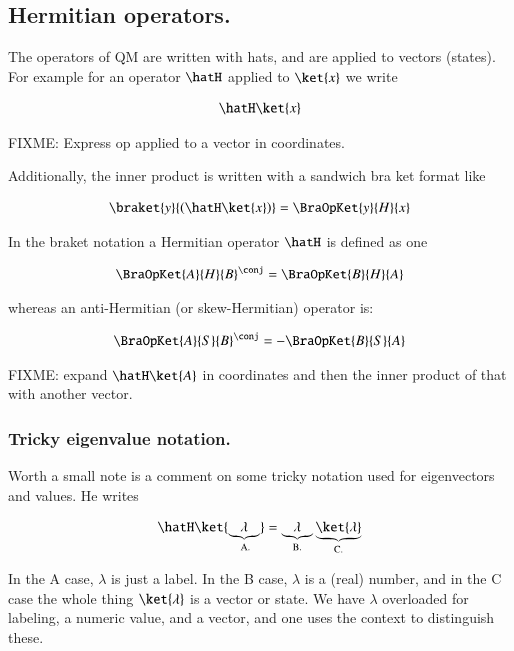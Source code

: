 \subsection{Hermitian operators. }

The operators of QM are written with hats, and are applied to vectors (states).  For example for an 
operator $\hatH$ applied to $\ket{x}$ we write

\begin{align*}
\hatH \ket{x}
\end{align*}

FIXME: Express op applied to a vector in coordinates.

Additionally, the inner product is written with a sandwich bra ket format like

\begin{align*}
\braket{y}{ \left(\hatH \ket{x} \right) }
=
\BraOpKet{y}{H}{x}
\end{align*}

In the braket notation a Hermitian operator $\hatH$ is defined as one 

\begin{align*}
\BraOpKet{A}{H}{B}^\conj = \BraOpKet{B}{H}{A}
\end{align*}

whereas an anti-Hermitian (or skew-Hermitian) operator is:

\begin{align*}
\BraOpKet{A}{S}{B}^\conj = -\BraOpKet{B}{S}{A}
\end{align*}

FIXME: expand $\hatH \ket{A}$ in coordinates and then the inner product of that with another vector.

\subsubsection{Tricky eigenvalue notation. } 

Worth a small note is a comment on some tricky notation used for eigenvectors and values.  He writes

\begin{align*}
\hatH \ket{\underbrace{\lambda}_{\text{ A.}}} = \underbrace{\lambda}_{\text{ B. }} \underbrace{\ket{\lambda}}_{\text{C.}}
\end{align*}

In the A case, $\lambda$ is just a label.  In the B case, $\lambda$ is a (real) number, and in the C case the whole thing $\ket{\lambda}$ is a vector or state.  We have $\lambda$ overloaded for labeling, a numeric value, and a vector, and one uses the context to distinguish these.

